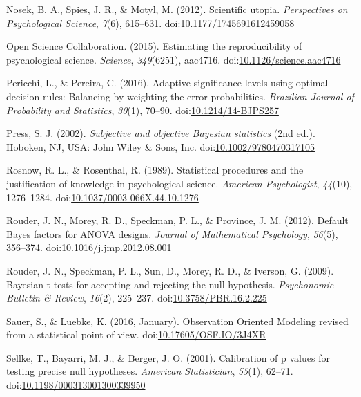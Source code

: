 \documentclass[,man, mask]{apa6}
\begin{document}
\leavevmode\hypertarget{ref-Nosek2012}{}%
Nosek, B. A., Spies, J. R., \& Motyl, M. (2012). Scientific utopia. \emph{Perspectives on Psychological Science}, \emph{7}(6), 615--631. doi:\href{https://doi.org/10.1177/1745691612459058}{10.1177/1745691612459058}

\leavevmode\hypertarget{ref-OpenScienceCollaboration2015}{}%
Open Science Collaboration. (2015). Estimating the reproducibility of psychological science. \emph{Science}, \emph{349}(6251), aac4716. doi:\href{https://doi.org/10.1126/science.aac4716}{10.1126/science.aac4716}

\leavevmode\hypertarget{ref-Pericchi2016}{}%
Pericchi, L., \& Pereira, C. (2016). Adaptive significance levels using optimal decision rules: Balancing by weighting the error probabilities. \emph{Brazilian Journal of Probability and Statistics}, \emph{30}(1), 70--90. doi:\href{https://doi.org/10.1214/14-BJPS257}{10.1214/14-BJPS257}

\leavevmode\hypertarget{ref-Press2002}{}%
Press, S. J. (2002). \emph{Subjective and objective Bayesian statistics} (2nd ed.). Hoboken, NJ, USA: John Wiley \& Sons, Inc. doi:\href{https://doi.org/10.1002/9780470317105}{10.1002/9780470317105}

\leavevmode\hypertarget{ref-Rosnow1989}{}%
Rosnow, R. L., \& Rosenthal, R. (1989). Statistical procedures and the justification of knowledge in psychological science. \emph{American Psychologist}, \emph{44}(10), 1276--1284. doi:\href{https://doi.org/10.1037/0003-066X.44.10.1276}{10.1037/0003-066X.44.10.1276}

\leavevmode\hypertarget{ref-Rouder2012}{}%
Rouder, J. N., Morey, R. D., Speckman, P. L., \& Province, J. M. (2012). Default Bayes factors for ANOVA designs. \emph{Journal of Mathematical Psychology}, \emph{56}(5), 356--374. doi:\href{https://doi.org/10.1016/j.jmp.2012.08.001}{10.1016/j.jmp.2012.08.001}

\leavevmode\hypertarget{ref-Rouder2009}{}%
Rouder, J. N., Speckman, P. L., Sun, D., Morey, R. D., \& Iverson, G. (2009). Bayesian t tests for accepting and rejecting the null hypothesis. \emph{Psychonomic Bulletin \& Review}, \emph{16}(2), 225--237. doi:\href{https://doi.org/10.3758/PBR.16.2.225}{10.3758/PBR.16.2.225}

\leavevmode\hypertarget{ref-Sauer2016}{}%
Sauer, S., \& Luebke, K. (2016, January). Observation Oriented Modeling revised from a statistical point of view. doi:\href{https://doi.org/10.17605/OSF.IO/3J4XR}{10.17605/OSF.IO/3J4XR}

\leavevmode\hypertarget{ref-Sellke2001}{}%
Sellke, T., Bayarri, M. J., \& Berger, J. O. (2001). Calibration of p values for testing precise null hypotheses. \emph{American Statistician}, \emph{55}(1), 62--71. doi:\href{https://doi.org/10.1198/000313001300339950}{10.1198/000313001300339950}
\end{document}
